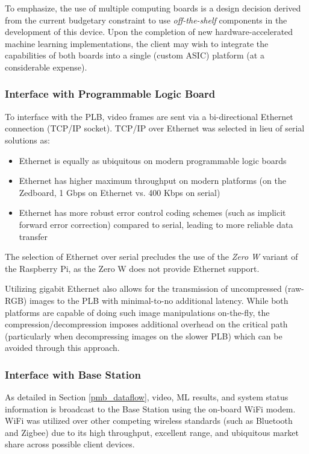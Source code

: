 To emphasize, the use of multiple computing boards is a design decision derived from the current budgetary constraint to use \textit{off-the-shelf} components in the development of this device. Upon the completion of new hardware-accelerated machine learning implementations, the client may wish to integrate the capabilities of both boards into a single (custom ASIC) platform (at a considerable expense). 

\subsubsection{Interface with Programmable Logic Board}

To interface with the PLB, video frames are sent via a bi-directional Ethernet connection (TCP/IP socket). TCP/IP over Ethernet was selected in lieu of serial solutions as:
\begin{itemize}
\item Ethernet is equally as ubiquitous on modern programmable logic boards
\item Ethernet has higher maximum throughput on modern platforms (on the Zedboard, 1 Gbps on Ethernet vs. 400 Kbps on serial)
\item Ethernet has more robust error control coding schemes (such as implicit forward error correction\cite{mclaughlin_warland}) compared to serial, leading to more reliable data transfer
\end{itemize} 

The selection of Ethernet over serial precludes the use of the \textit{Zero W} variant of the Raspberry Pi, as the Zero W does not provide Ethernet support. 

Utilizing gigabit Ethernet also allows for the transmission of uncompressed (raw-RGB) images to the PLB with minimal-to-no additional latency. While both platforms are capable of doing such image manipulations on-the-fly, the compression/decompression imposes additional overhead on the critical path (particularly when decompressing images on the slower PLB) which can be avoided through this approach. 

\subsubsection{Interface with Base Station}

As detailed in Section \ref{pmb_dataflow}, video, ML results, and system status information is broadcast to the Base Station using the on-board WiFi modem. WiFi was utilized over other competing wireless standards (such as Bluetooth and Zigbee) due to its high throughput, excellent range, and ubiquitous market share across possible client devices.

